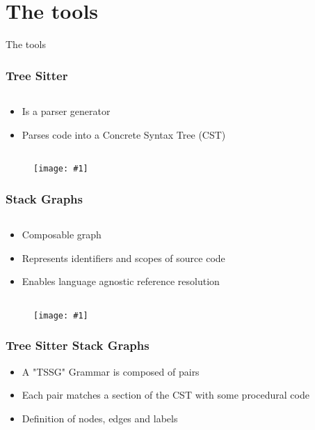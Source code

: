 \documentclass[table]{beamer}
\newcommand{\putimage}[2] {
  \begin{figure}[H]
    \centering
    \texttt{[image: \#1]}
	\end{figure}
}
\begin{document}
\section{The tools}
\begin{frame}
  \centering
  \huge The tools
\end{frame}

\begin{frame}[fragile]
  \frametitle{Tree Sitter}
  \begin{columns}
    \begin{column}{0.50\textwidth}
      \begin{itemize}
        \item Is a parser generator
				\item Parses code into a Concrete Syntax Tree (CST)
      \end{itemize}
    \end{column}
    \begin{column}{0.50\textwidth}
      
    \end{column}
  \end{columns}
  \putimage{images/plain/tree-sitter-example.png}{0.99}
\end{frame}

\begin{frame}[fragile]
  \frametitle{Stack Graphs}
  \begin{columns}
    \begin{column}{0.50\textwidth}
      \begin{itemize}
        \item Composable graph
        \item Represents identifiers and scopes of source code
        \item Enables language agnostic reference resolution
      \end{itemize}
    \end{column}
    \begin{column}{0.50\textwidth}
      
    \end{column}
  \end{columns}
  \putimage{images/d2/stack-graph-example.png}{0.99}
\end{frame}

\begin{frame}[fragile]
  \frametitle{Tree Sitter Stack Graphs}
  \begin{itemize}
    \item A "TSSG" Grammar is composed of pairs
    \item Each pair matches a section of the CST with some procedural code
    \item Definition of nodes, edges and labels
  \end{itemize}
  
\end{frame}
\end{document}
